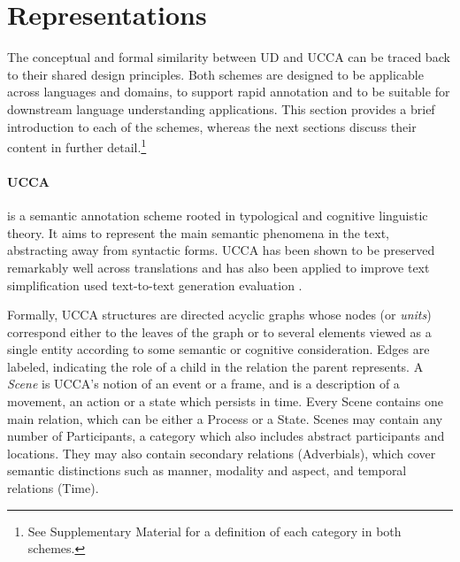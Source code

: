 \documentclass[11pt,a4paper]{article}
\begin{document}

\section{Representations}\label{sec:representations}

  The conceptual and formal similarity between UD and UCCA can be traced back
  to their shared design principles.
  Both schemes are designed to be applicable across languages and domains, 
  to support rapid annotation and to be suitable for downstream language understanding
  applications. This section provides a brief introduction to each of the schemes, whereas
  the next sections discuss their content in further
  detail.\footnote{See Supplementary Material for a definition of each category in both schemes.}
  


\paragraph{UCCA}\label{sec:ucca}
  \citep[Universal Cognitive Conceptual Annotation;][]{abend2013universal} is a semantic annotation scheme rooted in typological 
  and cognitive linguistic theory.
  It aims to represent the main semantic phenomena in the text, abstracting away from syntactic forms.
  UCCA has been shown to be preserved remarkably well across translations \citep{sulem2015conceptual} and has also been applied to
  improve text simplification \citep{sulem2018simple} used text-to-text generation evaluation \citep{birch2016hume,choshen2018usim,sulem2018samsa}.

  Formally, UCCA structures are directed acyclic graphs whose nodes (or {\it units}) correspond either to the leaves of the graph %
  or to several elements viewed as a single entity according to some semantic or cognitive consideration.
  Edges are labeled, indicating the role of a child in the relation the parent represents.
  A {\it Scene} is UCCA's notion of an event or a frame, and is a description of a movement, an action or a state which persists in time. 
  Every Scene contains one main relation, which can be either a Process or a State. 
  Scenes may contain any number of Participants, a category which also includes abstract participants and locations.
  They may also contain secondary relations (Adverbials), which cover semantic distinctions such as manner, modality and aspect,
  and temporal relations (Time).
\end{document}
